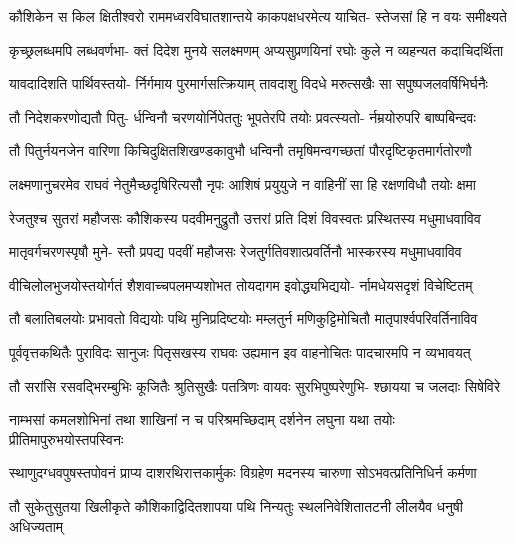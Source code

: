
\fourlineindentedshloka
{कौशिकेन स किल क्षितीश्वरो}
{राममध्वरविघातशान्तये}
{काकपक्षधरमेत्य याचित-}
{स्तेजसां हि न वयः समीक्ष्यते} %

\fourlineindentedshloka
{कृच्छ्रलब्धमपि लब्धवर्णभा-}
{क्तं दिदेश मुनये सलक्ष्मणम्}
{अप्यसुप्रणयिनां रघोः कुले}
{न व्यहन्यत कदाचिदर्थिता} %

\fourlineindentedshloka
{यावदादिशति पार्थिवस्तयो-}
{र्निर्गमाय पुरमार्गसत्क्रियाम्}
{तावदाशु विदधे मरुत्सखैः}
{सा सपुष्पजलवर्षिभिर्घनैः} %

\fourlineindentedshloka
{तौ निदेशकरणोद्यतौ पितु-}
{र्धन्विनौ चरणयोर्निपेततुः}
{भूपतेरपि तयोः प्रवत्स्यतो-}
{र्नम्रयोरुपरि बाष्पबिन्दवः} %

\fourlineindentedshloka
{तौ पितुर्नयनजेन वारिणा}
{किचिदुक्षितशिखण्डकावुभौ}
{धन्विनौ तमृषिमन्वगच्छतां}
{पौरदृष्टिकृतमार्गतोरणौ} %

\fourlineindentedshloka
{लक्ष्मणानुचरमेव राघवं}
{नेतुमैच्छदृषिरित्यसौ नृपः}
{आशिषं प्रयुयुजे न वाहिनीं}
{सा हि रक्षणविधौ तयोः क्षमा} %

\fourlineindentedshloka
{रेजतुश्च सुतरां महौजसः}
{कौशिकस्य पदवीमनुद्रुतौ}
{उत्तरां प्रति दिशं विवस्वतः}
{प्रस्थितस्य मधुमाधवाविव} %

\fourlineindentedshloka
{मातृवर्गचरणस्पृषौ मुने-}
{स्तौ प्रपद्य पदवीं महौजसः}
{रेजतुर्गतिवशात्प्रवर्तिनौ}
{भास्करस्य मधुमाधवाविव} %

\fourlineindentedshloka
{वीचिलोलभुजयोस्तयोर्गतं}
{शैशवाच्चपलमप्यशोभत}
{तोयदागम इवोद्ध्यभिद्ययो-}
{र्नामधेयसदृशं विचेष्टितम्} %

\fourlineindentedshloka
{तौ बलातिबलयोः प्रभावतो}
{विद्ययोः पथि मुनिप्रदिष्टयोः}
{मम्लतुर्न मणिकुट्टिमोचितौ}
{मातृपार्श्वपरिवर्तिनाविव} %

\twolineshloka
{पूर्ववृत्तकथितैः पुराविदः सानुजः पितृसखस्य राघवः}
{उह्यमान इव वाहनोचितः पादचारमपि न व्यभावयत्} %

\fourlineindentedshloka
{तौ सरांसि रसवद्भिरम्बुभिः}
{कूजितैः श्रुतिसुखैः पतत्रिणः}
{वायवः सुरभिपुष्परेणुभि-}
{श्छायया च जलदाः सिषेविरे} %

\fourlineindentedshloka
{नाम्भसां कमलशोभिनां तथा}
{शाखिनां न च परिश्रमच्छिदाम्}
{दर्शनेन लघुना यथा तयोः}
{प्रीतिमापुरुभयोस्तपस्विनः} %

\fourlineindentedshloka
{स्थाणुदग्धवपुषस्तपोवनं}
{प्राप्य दाशरथिरात्तकार्मुकः}
{विग्रहेण मदनस्य चारुणा}
{सोऽभवत्प्रतिनिधिर्न कर्मणा} %

\twolineshloka
{तौ सुकेतुसुतया खिलीकृते कौशिकाद्विदितशापया पथि}
{निन्यतुः स्थलनिवेशितातटनी लीलयैव धनुषी अधिज्यताम्} %

